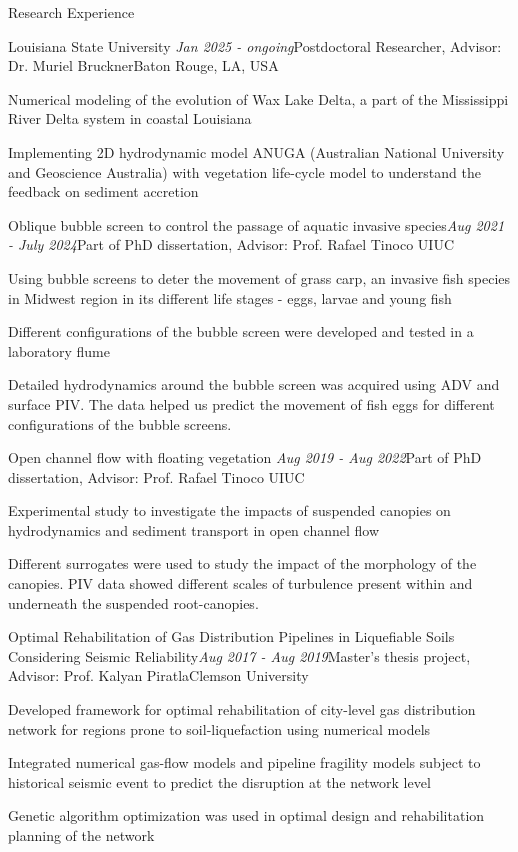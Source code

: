\documentclass{resume} %
\begin{document}
\begin{rSection}{Research Experience}

\begin{rSubsection}{Louisiana State University} {\em Jan 2025 - ongoing}{Postdoctoral Researcher, Advisor: Dr. Muriel Bruckner}{Baton Rouge, LA, USA}
\item Numerical modeling of the evolution of Wax Lake Delta, a part of the Mississippi River Delta system in coastal Louisiana
\item Implementing 2D hydrodynamic model ANUGA (Australian National University and Geoscience Australia) with vegetation life-cycle model to understand the feedback on sediment accretion 
\end{rSubsection}

\begin{rSubsection}{Oblique bubble screen to control the passage of aquatic invasive species}{\em Aug 2021 - July 2024}{Part of PhD dissertation, Advisor: Prof. Rafael Tinoco }{UIUC}
\item Using bubble screens to deter the movement of grass carp, an invasive fish species in Midwest region in its different life stages - eggs, larvae and young fish
\item Different configurations of the bubble screen were developed and tested in a laboratory flume
\item Detailed hydrodynamics around the bubble screen was acquired using ADV and surface PIV. The data helped us predict the movement of fish eggs for different configurations of the bubble screens. 
\end{rSubsection}

\begin{rSubsection}{Open channel flow with floating vegetation} {\em Aug 2019 - Aug 2022}{Part of PhD dissertation, Advisor: Prof. Rafael Tinoco }{UIUC}
\item Experimental study to investigate the impacts of suspended canopies on hydrodynamics and sediment transport in open channel flow
\item Different surrogates were used to study the impact of the morphology of the canopies. PIV data showed different scales of turbulence present within and underneath the suspended root-canopies.
\end{rSubsection}

\begin{rSubsection}{Optimal Rehabilitation of Gas Distribution Pipelines in Liquefiable Soils Considering Seismic Reliability}{\em Aug 2017 - Aug 2019}{Master's thesis  project, Advisor: Prof. Kalyan Piratla}{Clemson University}
\item Developed framework for optimal rehabilitation of city-level gas distribution network for regions prone to soil-liquefaction using numerical models
\item Integrated numerical gas-flow models and pipeline fragility models subject to historical seismic event to predict the disruption at the network level 
\item Genetic algorithm optimization was used in optimal design and rehabilitation planning of the network
\end{rSubsection}


\end{rSection}
\end{document}
